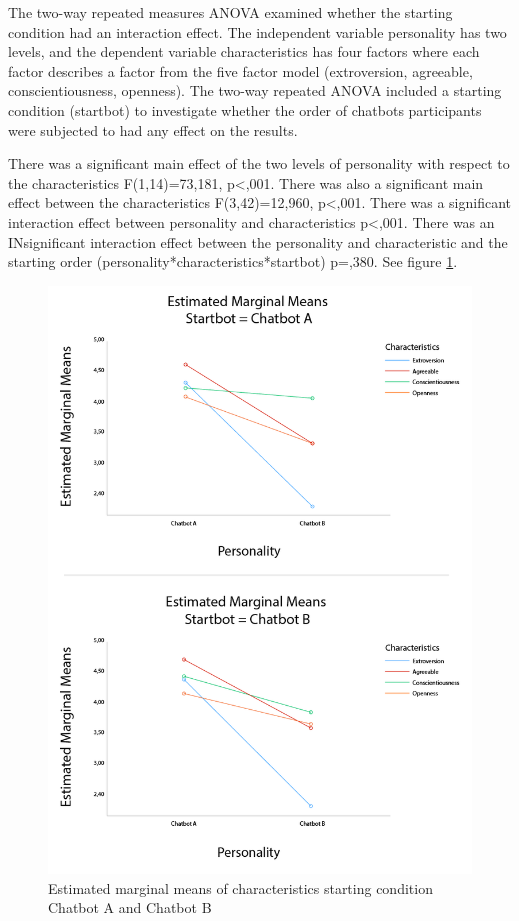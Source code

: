 The two-way repeated measures ANOVA examined whether the starting condition had an interaction effect. The independent variable personality has two levels, and the dependent variable characteristics has four factors where each factor describes a factor from the five factor model (extroversion, agreeable, conscientiousness, openness). The two-way repeated ANOVA included a starting condition (startbot) to investigate whether the order of chatbots participants were subjected to had any effect on the results.

There was a significant main effect of the two levels of personality with respect to the characteristics F(1,14)=73,181, p<,001. There was also a significant main effect between the characteristics F(3,42)=12,960, p<,001. There was a significant interaction effect between personality and characteristics p<,001. There was an INsignificant interaction effect between the personality and characteristic and the starting order (personality*characteristics*startbot) p=,380. See figure \ref{fig:characstartAB}.

\begin{figure}[h]
    \centering
    \includegraphics[scale=0.4]{figures/MMeanStartbotABCharacteristics.png}
    \caption{Estimated marginal means of characteristics starting condition Chatbot A and Chatbot B}
    \label{fig:characstartAB}
\end{figure}

